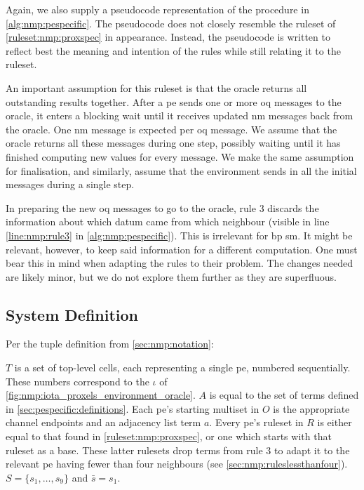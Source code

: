 Again, we also supply a pseudocode representation of the procedure in \cref{alg:nmp:pespecific}.  The pseudocode does not closely resemble the ruleset of \cref{ruleset:nmp:proxspec} in appearance.  Instead, the pseudocode is written to reflect best the meaning and intention of the rules while still relating it to the ruleset.

An important assumption for this ruleset is that the oracle returns all outstanding results together.  After a \gls{pe} sends one or more \gls{oq} messages to the oracle, it enters a blocking wait until it receives updated \gls{nm} messages back from the oracle.  One \gls{nm} message is expected per \gls{oq} message.  We assume that the oracle returns all these messages during one step, possibly waiting until it has finished computing new values for every message.  We make the same assumption for finalisation, and similarly, assume that the environment sends in all the initial messages during a single step.

In preparing the new \gls{oq} messages to go to the oracle, rule 3 discards the information about which datum came from which neighbour (visible in line \ref{line:nmp:rule3} in \cref{alg:nmp:pespecific}).  This is irrelevant for \gls{bp} \gls{sm}.  It might be relevant, however, to keep said information for a different computation.  One must bear this in mind when adapting the rules to their problem.  The changes needed are likely minor, but we do not explore them further as they are superfluous.

\subsection{System Definition}
Per the tuple definition from \cref{sec:nmp:notation}:

\(T\) is a set of top-level cells, each representing a single \gls{pe}, numbered sequentially.  These numbers correspond to the \(\iota\) of \cref{fig:nmp:iota_proxels_environment_oracle}.  \(A\) is equal to the set of terms defined in \cref{sec:pespecific:definitions}.  Each \gls{pe}'s starting multiset in \(O\) is the appropriate channel endpoints and an adjacency list term \(a\).  Every \gls{pe}'s ruleset in \(R\) is either equal to that found in \cref{ruleset:nmp:proxspec}, or one which starts with that ruleset as a base.  These latter rulesets drop terms from rule 3 to adapt it to the relevant \gls{pe} having fewer than four neighbours (see \cref{sec:nmp:ruleslessthanfour}).  \(S = \{s_1, \dots, s_9\}\) and \(\bar{s} = s_1\).

